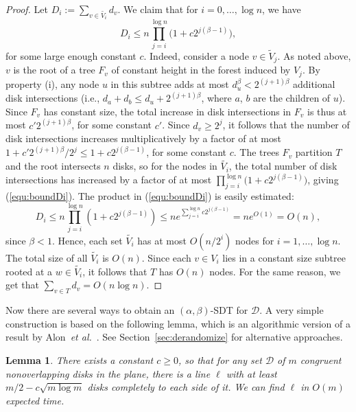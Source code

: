 \documentclass{paper}
\newcommand {\eqdef}{:=}
\newcommand {\script} [1] {\ensuremath {\mathcal {#1}}}
\newcommand {\etal} {\textit {et al.}}
\newcommand {\D} {\script {D}}
\newtheorem{lemma}[theorem]{Lemma}
\begin{document}
\begin{proof}
Let $D_i \eqdef \sum_{v \in \widetilde{V_i}} d_v$.
We claim that for $i = 0, \dots, \log n $, we have  
\begin{equation}\label{equ:boundDi}
D_i \leq n \prod_{j=i}^{\log n}\bigl(1+c2^{j(\beta-1)}\bigr), 
\end{equation}
for some large enough constant $c$.
Indeed, consider a node $v \in \widetilde{V}_j$.
As noted above, $v$ is the root of a tree $F_v$ of constant height in the 
forest induced by $V_j$.
By property (i), any node  $u$ in this subtree adds at most 
$d_u^\beta < 2^{(j+1)\beta}$ additional disk intersections (i.e., 
$d_a +d_b \leq d_u + 2^{(j+1)\beta}$, where $a$, $b$ are the children of
$u$).
Since 
$F_v$ has
constant size, the total increase in disk intersections in $F_v$
is thus at most $c'2^{(j+1)\beta}$, for some constant $c'$. 
Since $d_v \geq 2^j$, it follows that the number of disk intersections
increases multiplicatively by a factor of at most $1+c'2^{(j+1)\beta}/2^j \leq
1+c2^{j(\beta-1)}$, for some constant $c$.
The trees $F_v$ partition $T$ and the root intersects
$n$ disks, so for the nodes in $\widetilde{V_i}$, the total number of 
disk intersections
has increased by a factor of at most 
$\prod_{j=i}^{\log n}\bigl(1+c2^{j(\beta-1)}\bigr)$, giving 
(\ref{equ:boundDi}). The product in (\ref{equ:boundDi}) is easily estimated:
\[
D_i \leq n \prod_{j=i}^{\log n}(1 + c2^{j(\beta-1)})
\leq n e^{\sum_{j=i}^{\log n} c2^{j(\beta-1)}}
= n e^{O(1)} = O(n),
\]
since $\beta < 1$. Hence, each set $\widetilde{V_i}$ has at most
$O(n/2^i)$ nodes for $i = 1, \dots, \log n$. The total size of all 
$\widetilde{V_i}$ is $O(n)$.
Since each $v \in V_i$  lies in a constant size subtree rooted at 
a $w \in \widetilde{V_i}$, it follows that $T$ has $O(n)$ nodes.
For the same reason, we get that
$\sum_{v\in T} d_v = O(n \log n)$.
\end{proof}

Now there are several ways to obtain an $(\alpha, \beta)$-SDT 
for $\D$.
A very simple construction is based on the following lemma, which 
is an algorithmic version of a result by 
Alon~\etal~\cite[Theorem~1.2]{akp-cddsl-89}. 
See Section~\ref{sec:derandomize} for alternative approaches.

\begin{lemma}\label{lem:line-separator}
There exists a constant $c \geq 0$, so that for any set $\D$ of 
$m$ congruent nonoverlapping disks in the plane, there is a 
line $\ell$ with at least $m / 2 - c \sqrt {m \log m}$ disks completely 
to each side of it. We can find $\ell$ in 
$O(m)$ expected time.
\end{lemma}
\end{document}
